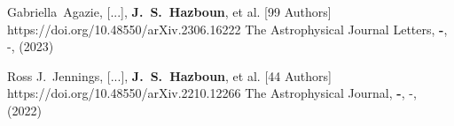          {Gabriella~{Agazie}, [...], \textbf{J.~S.~{Hazboun}}, et al. [99 Authors]}
         {https://doi.org/10.48550/arXiv.2306.16222}
         {{The Astrophysical Journal Letters}, \textbf{-}, -, (2023)}

         {Ross J.~{Jennings}, [...], \textbf{J.~S.~{Hazboun}}, et al. [44 Authors]}
         {https://doi.org/10.48550/arXiv.2210.12266}
         {{The Astrophysical Journal}, \textbf{-}, -, (2022)}

